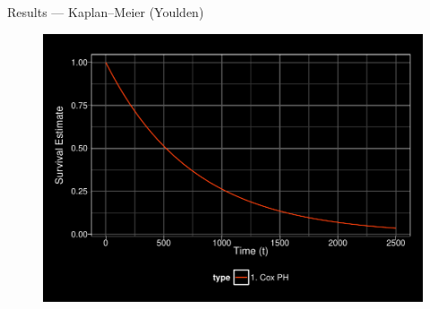 \documentclass[12pt,t]{beamer}
\begin{document}

\begin{frame}[c]{Results --- Kaplan--Meier (Youlden)}

\begin{center}
\begin{figure}[H]
\begin{center}
\includegraphics[width=\textwidth]{Figs/s1_cox.pdf}
\end{center}
\end{figure}
\end{center}

\note{
}

\end{frame}

\end{document}
